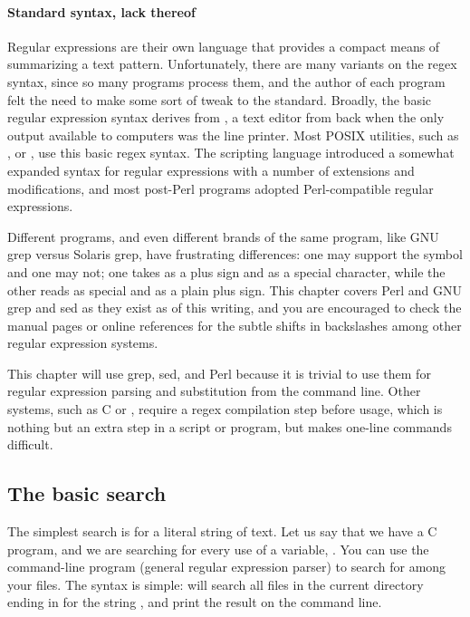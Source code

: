 \paragraph{Standard syntax, lack thereof} Regular expressions are
their own language that provides a compact means of summarizing a text
pattern. Unfortunately, there are many variants on the regex syntax,
since so many programs process them, and the author of each program felt
the need to make some sort of tweak to the standard.  Broadly, the basic
regular expression syntax derives from , a text editor from back
when the only output available to computers was the line printer. Most
POSIX utilities, such as ,  or ,
use this basic regex syntax. The scripting language 
introduced a somewhat expanded syntax for regular expressions with
a number of extensions and modifications, and most post-Perl programs
adopted Perl-compatible regular expressions.

Different programs, and even different brands of the same
program, like GNU grep versus Solaris grep, have frustrating
differences: one may support the  symbol and one may not; 
one takes \ci{+} as a plus sign and  \ci{\textbs+} as a special
character, while the other reads \ci{+} as special and \ci{\textbs+}
as a plain plus sign. This chapter covers Perl and GNU grep and sed as they exist as
of this writing, and you are encouraged to check the manual pages or
online references for the subtle shifts in backslashes among other
regular expression systems.


This chapter will use grep, sed, and Perl because it is trivial to
use them for regular expression parsing and substitution from the
command line. Other systems, such as C or , require a regex
compilation step before usage, which is nothing but an extra step in a
script or program, but makes one-line commands difficult.

\subsection{The basic search}\label{grep}
The simplest search is for a literal string of text. Let us say that we
have a C program, and we are searching for every use of a variable,
. You can use the command-line program  (general
regular expression parser) to search for  among your files. The
syntax is simple:  will search all files in the current
directory ending in  for the string , and print the result
on the command line.

